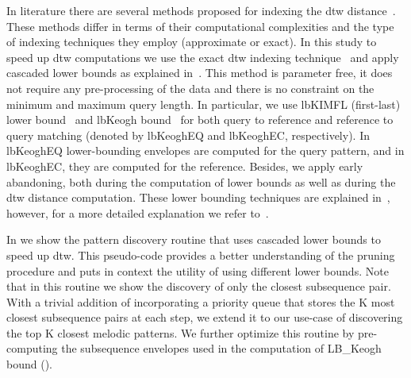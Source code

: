 In literature there are several methods proposed for indexing the \gls{dtw} distance~\citep{Keogh2004,vlachos2003indexing,kim2001index}. These methods differ in terms of their computational complexities and the type of indexing techniques they employ (approximate or exact). In this study to speed up \gls{dtw} computations we use the exact \gls{dtw} indexing technique~\citep{Keogh2004} and apply cascaded lower bounds as explained in~\cite{Rakthanmanon2013}. This method is parameter free, it does not require any pre-processing of the data and there is no constraint on the minimum and maximum query length. In particular, we use \acrshort{lbKIMFL} (first-last) lower bound~\citep{kim2001index} and \acrshort{lbKeogh} bound~\citep{Keogh2004} for both query to reference and reference to query matching (denoted by \acrshort{lbKeoghEQ} and \acrshort{lbKeoghEC}, respectively). In \acrshort{lbKeoghEQ} lower-bounding envelopes are computed for the query pattern, and in \acrshort{lbKeoghEC}, they are computed for the reference. Besides, we apply early abandoning, both during the computation of lower bounds as well as during the \gls{dtw} distance computation. These lower bounding techniques are explained in~, however, for a more detailed explanation we refer to~\cite{Rakthanmanon2013}. 

In  we show the pattern discovery routine that uses cascaded lower bounds to speed up \gls{dtw}. This pseudo-code provides a better understanding of the pruning procedure and puts in context the utility of using different lower bounds. Note that in this routine we show the discovery of only the closest subsequence pair. With a trivial addition of incorporating a priority queue that stores the K most closest subsequence pairs at each step, we extend it to our use-case of discovering the top K closest melodic patterns. We further optimize this routine by pre-computing the subsequence envelopes used in the computation of LB\_Keogh bound ().

